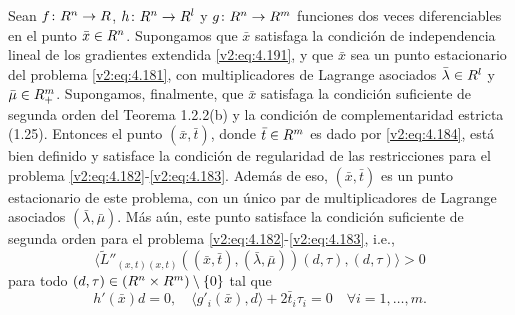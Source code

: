 \begin{lemma}\label{v2:lem:4.5.2}
    Sean $f \colon R^n \to R$, $h \colon R^n \to R^l$ y $g \colon R^n \to R^m$ funciones dos veces diferenciables en el punto $\bar{x} \in R^n$. Supongamos que $\bar{x}$ satisfaga la condición de independencia lineal de los gradientes extendida \eqref{v2:eq:4.191}, y que $\bar{x}$ sea un punto estacionario del problema \eqref{v2:eq:4.181}, con multiplicadores de Lagrange asociados $\bar{\lambda} \in R^l$ y $\bar{\mu} \in R^m_+$. Supongamos, finalmente, que $\bar{x}$ satisfaga la condición suficiente de segunda orden del Teorema 1.2.2(b) y la condición de complementaridad estricta (1.25).
    Entonces el punto $(\bar{x}, \bar{t})$, donde $\bar{t} \in R^m$ es dado por \eqref{v2:eq:4.184}, está bien definido y satisface la condición de regularidad de las restricciones para el problema \eqref{v2:eq:4.182}-\eqref{v2:eq:4.183}. Además de eso, $(\bar{x}, \bar{t})$ es un punto estacionario de este problema, con un único par de multiplicadores de Lagrange asociados $(\bar{\lambda}, \bar{\mu})$. Más aún, este punto satisface la condición suficiente de segunda orden para el problema \eqref{v2:eq:4.182}-\eqref{v2:eq:4.183}, i.e.,
    \begin{equation}
        \langle \tilde{L}''_{(x,t)(x,t)}((\bar{x}, \bar{t}), (\bar{\lambda}, \bar{\mu}))(d, \tau), (d, \tau) \rangle > 0
        \label{v2:eq:4.192}
    \end{equation}
    para todo $(d, \tau) \in (R^n \times R^m) \setminus \{0\}$ tal que
    \begin{equation}
        h'(\bar{x})d = 0, \quad \langle g'_i(\bar{x}), d \rangle + 2\bar{t}_i \tau_i = 0 \quad \forall i = 1, \dots, m.
        \label{v2:eq:4.193}
    \end{equation}
\end{lemma}
